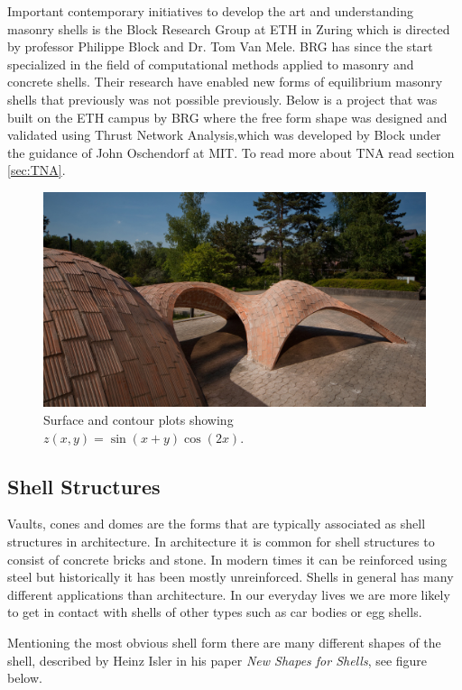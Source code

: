 Important contemporary initiatives to develop the art and understanding masonry shells is the Block Research Group at ETH in Zuring which is directed by professor Philippe Block and Dr. Tom Van Mele. BRG has since the start specialized in the field of computational methods applied to masonry and concrete shells. Their research have enabled new forms of equilibrium masonry shells that previously was not possible previously. Below is a project that was built on the ETH campus by BRG where the free form shape was designed and validated using Thrust Network Analysis,which was developed by Block under the guidance of John Oschendorf at MIT. \cite{ref:Davis} To read more about TNA read section \ref{sec:TNA}. 

\begin{figure}[H]
\centering
\includegraphics[width=0.9\linewidth ]{figure/Introduction/Block_Vault.jpg}
\caption{Surface and contour plots showing $z(x,y)=\sin(x+y)\cos(2x)$.}
\end{figure}

\subsection{Shell Structures}

Vaults, cones and domes are the forms that are typically associated as shell structures in architecture. In architecture it is common for shell structures to consist of concrete bricks and stone. In modern times it can be reinforced using steel but historically it has been mostly unreinforced. Shells in general has many different applications than architecture. In our everyday lives we are more likely to get in contact with shells of other types such as car bodies or egg shells.

Mentioning the most obvious shell form there are many different shapes of the shell, described by Heinz Isler in his paper \textit{New Shapes for Shells}, see figure below.


